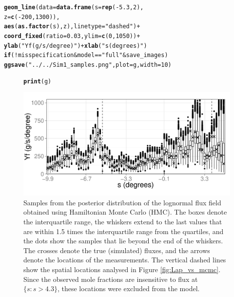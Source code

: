 \documentclass[a4paper,11pt]{article}\usepackage[]{graphicx}\usepackage[]{color}
\makeatletter
\def\maxwidth{ %
  \ifdim\Gin@nat@width>\linewidth
    \linewidth
  \else
    \Gin@nat@width
  \fi
}
\newcommand{\hlnum}[1]{\textcolor[rgb]{0.686,0.059,0.569}{#1}}%
\newcommand{\hlstr}[1]{\textcolor[rgb]{0.192,0.494,0.8}{#1}}%
\newcommand{\hlopt}[1]{\textcolor[rgb]{0,0,0}{#1}}%
\newcommand{\hlstd}[1]{\textcolor[rgb]{0.345,0.345,0.345}{#1}}%
\newcommand{\hlkwa}[1]{\textcolor[rgb]{0.161,0.373,0.58}{\textbf{#1}}}%
\newcommand{\hlkwc}[1]{\textcolor[rgb]{0.333,0.667,0.333}{#1}}%
\newcommand{\hlkwd}[1]{\textcolor[rgb]{0.737,0.353,0.396}{\textbf{#1}}}%
\newenvironment{kframe}{%
 \def\at@end@of@kframe{}%
 \ifinner\ifhmode%
  \def\at@end@of@kframe{\end{minipage}}%
  \begin{minipage}{\columnwidth}%
 \fi\fi%
 \def\FrameCommand##1{\hskip\@totalleftmargin \hskip-\fboxsep
 \colorbox{shadecolor}{##1}\hskip-\fboxsep
     \hskip-\linewidth \hskip-\@totalleftmargin \hskip\columnwidth}%
 \MakeFramed {\advance\hsize-\width
   \@totalleftmargin\z@ \linewidth\hsize
   \@setminipage}}%
 {\par\unskip\endMakeFramed%
 \at@end@of@kframe}
\newenvironment{knitrout}{}{} %
\makeatother
\begin{document}
\begin{knitrout}
\begin{kframe}
\begin{alltt}
  \hlkwd{geom_line}\hlstd{(}\hlkwc{data}\hlstd{=}\hlkwd{data.frame}\hlstd{(}\hlkwc{s}\hlstd{=}\hlkwd{rep}\hlstd{(}\hlopt{-}\hlnum{5.3}\hlstd{,}\hlnum{2}\hlstd{),}
                            \hlkwc{z}\hlstd{=}\hlkwd{c}\hlstd{(}\hlopt{-}\hlnum{200}\hlstd{,}\hlnum{1300}\hlstd{)),}
            \hlkwd{aes}\hlstd{(}\hlkwd{as.factor}\hlstd{(s),z),}\hlkwc{linetype}\hlstd{=}\hlstr{"dashed"}\hlstd{)} \hlopt{+}
  \hlkwd{coord_fixed}\hlstd{(}\hlkwc{ratio} \hlstd{=} \hlnum{0.03}\hlstd{,} \hlkwc{ylim}\hlstd{=}\hlkwd{c}\hlstd{(}\hlnum{0}\hlstd{,}\hlnum{1050}\hlstd{))} \hlopt{+}
  \hlkwd{ylab}\hlstd{(}\hlstr{"Yf (g/s/degree)"}\hlstd{)} \hlopt{+} \hlkwd{xlab}\hlstd{(}\hlstr{"s (degrees)"}\hlstd{)}
\hlkwa{if}\hlstd{(}\hlopt{!}\hlstd{misspecification} \hlopt{&} \hlstd{model}\hlopt{==}\hlstr{"full"} \hlopt{&} \hlstd{save_images)}
  \hlkwd{ggsave}\hlstd{(}\hlstr{"../../Sim1_samples.png"}\hlstd{,}\hlkwc{plot} \hlstd{= g,}\hlkwc{width}\hlstd{=}\hlnum{10}\hlstd{)}
\end{alltt}
\end{kframe}
\end{knitrout}


\begin{figure}
\begin{center}
\begin{knitrout}
\color{fgcolor}\begin{kframe}
\begin{alltt}
\hlkwd{print}\hlstd{(g)}
\end{alltt}
\end{kframe}
\includegraphics[width=\maxwidth]{figure/HMC-plot-1} 

\end{knitrout}
\end{center}
\caption{Samples from the posterior distribution of the lognormal flux field obtained using Hamiltonian Monte Carlo (HMC). The boxes denote the interquartile range, the whiskers extend to the last values that are within 1.5 times the interquartile range from the quartiles, and the dots show the samples that lie beyond the end of the whiskers. The crosses denote the true (simulated) fluxes, and the arrows denote the locations of the measurements. The vertical dashed lines show the spatial locations analysed in Figure \ref{fig:Lap_vs_mcmc}. Since the observed mole fractions are insensitive to flux at $\{s : s > 4.3\}$, these locations were excluded from the model.}
\label{fig:Slice}
\end{figure}
\end{document}
